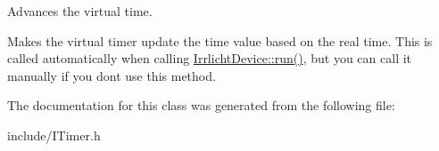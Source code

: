 Advances the virtual time. 

Makes the virtual timer update the time value based on the real time. This is called automatically when calling \hyperlink{classirr_1_1IrrlichtDevice_a0489f8151dc43f6f41503ffb5a160b35}{Irrlicht\+Device\+::run()}, but you can call it manually if you don\textquotesingle{}t use this method. 

The documentation for this class was generated from the following file\+:\begin{DoxyCompactItemize}
\item 
include/I\+Timer.\+h\end{DoxyCompactItemize}

